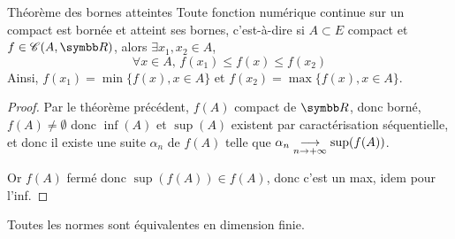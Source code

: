 \begin{theoreme}{Théorème des bornes atteintes}{}
    Toute fonction numérique continue sur un compact est bornée et atteint ses bornes, c'est-à-dire 
    si $A \subset E$ compact et $f \in \mathscr C(A, \R)$, alors 
    $\exists x_1, x_2 \in A$,
    \[\forall x \in A, \, f(x_1) \leqslant f(x) \leqslant f(x_2)\]
    Ainsi, $f(x_1) = \min \{ f(x), x \in A \}$ et $f(x_2) = \max \{ f(x), x \in A \}$.
\end{theoreme}


\begin{proof}
    Par le théorème précédent, $f(A)$ compact de $\R$, donc borné, $f(A) \neq \emptyset$ donc 
    $ \inf(A)$ et $\sup(A)$ existent par caractérisation séquentielle, et donc il existe une suite 
    $\alpha_n$ de $f(A)$ telle que $\alpha_n \underset{n \to + \infty}{\longrightarrow} \sup(f(A))$.

    Or $f(A)$ fermé donc $\sup(f(A)) \in f(A)$, donc c'est un max, idem pour l'inf. 
\end{proof}

\begin{theoreme}{}{}
    Toutes les normes sont équivalentes en dimension finie.
\end{theoreme}


